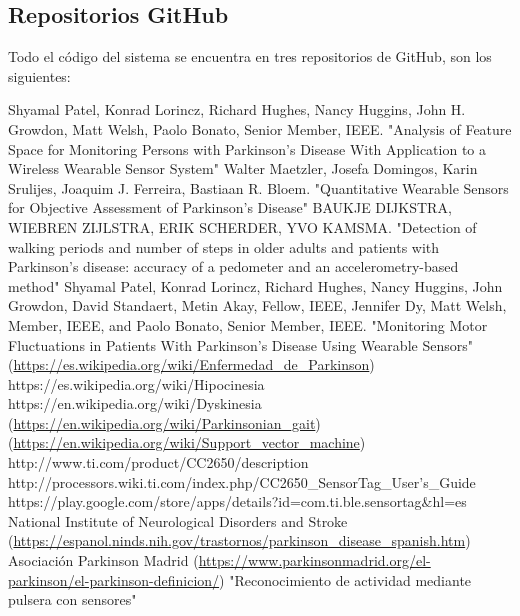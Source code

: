 \documentclass[11pt,spanish]{article}
\begin{document}
\subsection{Repositorios GitHub}
Todo el código del sistema se encuentra en tres repositorios de GitHub, son los siguientes:


\newpage
\begin{thebibliography}{10}
    Shyamal Patel, Konrad Lorincz, Richard Hughes, Nancy Huggins, John H. Growdon, Matt Welsh, Paolo 		Bonato, Senior Member, IEEE. "Analysis of Feature Space for Monitoring Persons with Parkinson’s
	Disease With Application to a Wireless Wearable Sensor System"
    Walter Maetzler, Josefa Domingos, Karin Srulijes, Joaquim J. Ferreira, Bastiaan R. Bloem.       	     "Quantitative Wearable Sensors for Objective Assessment of Parkinson’s Disease"
    BAUKJE DIJKSTRA, WIEBREN ZIJLSTRA, ERIK SCHERDER, YVO KAMSMA. "Detection of walking periods and 	     number of steps in older adults and patients with Parkinson’s disease: accuracy of a pedometer and       an accelerometry-based method"
    Shyamal Patel, Konrad Lorincz, Richard Hughes, Nancy Huggins, John Growdon, David Standaert, Metin       Akay, Fellow, IEEE, Jennifer Dy, Matt Welsh, Member, IEEE, and Paolo Bonato, Senior Member, IEEE.       "Monitoring Motor Fluctuations in Patients With Parkinson’s Disease Using Wearable Sensors"
     (\url{https://es.wikipedia.org/wiki/Enfermedad_de_Parkinson})
     https://es.wikipedia.org/wiki/Hipocinesia
     https://en.wikipedia.org/wiki/Dyskinesia
     (\url {https://en.wikipedia.org/wiki/Parkinsonian_gait})
     (\url {https://en.wikipedia.org/wiki/Support_vector_machine})
     http://www.ti.com/product/CC2650/description
     http://processors.wiki.ti.com/index.php/CC2650\_SensorTag\_User's\_Guide
     https://play.google.com/store/apps/details?id=com.ti.ble.sensortag\&hl=es
     National Institute of Neurological Disorders and Stroke (\url{https://espanol.ninds.nih.gov/trastornos/parkinson_disease_spanish.htm})
     Asociación Parkinson Madrid (\url{https://www.parkinsonmadrid.org/el-parkinson/el-parkinson-definicion/})
     "Reconocimiento de actividad mediante pulsera con sensores"
\end{thebibliography}
\end{document}

